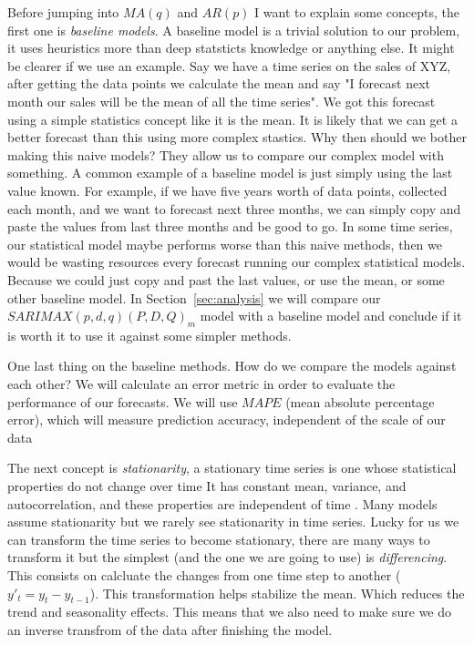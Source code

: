 \documentclass[journal]{IEEEtran}
\begin{document}
Before jumping into $MA(q)$ and $AR(p)$ I want to explain some concepts, the
first one is \emph{baseline models}. A baseline model is a trivial solution
to our problem, it uses heuristics more than deep statsticts knowledge or
anything else. It might be clearer if we use an example. Say we have a time
series on the sales of XYZ, after getting the data points we calculate the
mean and say "I forecast next month our sales will be the mean of all the time
series". We got this forecast using a simple statistics concept like it is the
mean. It is likely that  we can get a better forecast than this using more
complex stastics. Why then should we bother making this naive models? They
allow us to compare our complex model with something. A common example of a
baseline model is just simply using the last value known. For example, if we
have five years worth of data points, collected each month, and we want to
forecast next three months, we can simply copy and paste the values from last
three months and be good to go. In some time series, our statistical model
maybe performs worse than this naive methods, then we would be wasting
resources every forecast running our complex statistical models. Because we
could just copy and past the last values, or use the mean, or some other
baseline model. In Section~\ref {sec:analysis} we will compare our
$SARIMAX(p,d,q)(P,D,Q)_m$ model with a baseline model and conclude if it is
worth it to use it against some simpler methods.

One last thing on the baseline methods. How do we compare the models against
each other? We will calculate an error metric in order to evaluate the
performance of our forecasts. We will use $MAPE$ (mean absolute percentage
error), which will measure prediction accuracy, independent of the scale of
our data

The next concept is \emph{stationarity}, a stationary time series is one whose
statistical properties do not change over time It has constant mean, variance,
and autocorrelation, and these properties are independent of time
\cite{timeseries}. Many models assume stationarity but we rarely see
stationarity in time series. Lucky for us we can transform the time series to
become stationary, there are many ways to transform it but the simplest (and
the one we are going to use) is \emph{differencing}. This consists on
calcluate the changes from one time step to another ($y'_t = y_t - y_{t-1}$). This transformation helps
stabilize the mean. Which reduces the trend and seasonality effects. This
means that we also need to make sure we do an inverse transfrom of the data
after finishing the model.
\end{document}
